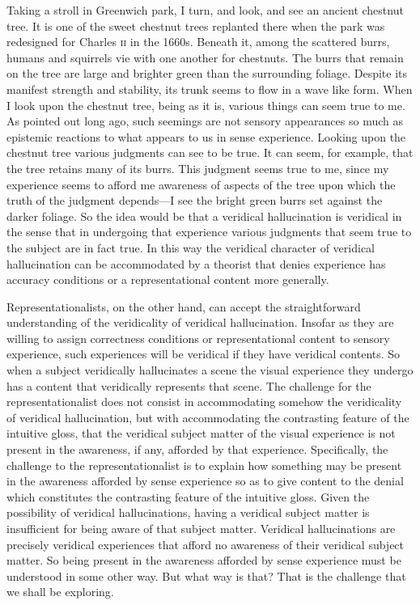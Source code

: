 \documentclass[12pt]{article}
\begin{document}
Taking a stroll in Greenwich park, I turn, and look, and see an ancient chestnut tree. It is one of the sweet chestnut trees replanted there when the park was redesigned for Charles \textsc{ii} in the 1660s. Beneath it, among the scattered burrs, humans and squirrels vie with one another for chestnuts. The burrs that remain on the tree are large and brighter green than the surrounding foliage. Despite its manifest strength and stability, its trunk seems to flow in a wave like form. When I look upon the chestnut tree, being as it is, various things can seem true to me. As \citet{Price:1952ix} pointed out long ago, such seemings are not sensory appearances so much as epistemic reactions to what appears to us in sense experience. Looking upon the chestnut tree various judgments can see to be true. It can seem, for example, that the tree retains many of its burrs. This judgment seems true to me, since my experience seems to afford me awareness of aspects of the tree upon which the truth of the judgment depends---I see the bright green burrs set against the darker foliage. So the idea would be that a veridical hallucination is veridical in the sense that in undergoing that experience various judgments that seem true to the subject are in fact true. In this way the veridical character of veridical hallucination can be accommodated by a theorist that denies experience has accuracy conditions or a representational content more generally.

Representationalists, on the other hand, can accept the straightforward understanding of the veridicality of veridical hallucination. Insofar as they are willing to assign correctness conditions or representational content to sensory experience, such experiences will be veridical if they have veridical contents. So when a subject veridically hallucinates a scene the visual experience they undergo has a content that veridically represents that scene. The challenge for the representationalist does not consist in accommodating somehow the veridicality of veridical hallucination, but with accommodating the contrasting feature of the intuitive gloss, that the veridical subject matter of the visual experience is not present in the awareness, if any, afforded by that experience. Specifically, the challenge to the representationalist is to explain how something may be present in the awareness afforded by sense experience so as to give content to the denial which constitutes the contrasting feature of the intuitive gloss. Given the possibility of veridical hallucinations, having a veridical subject matter is insufficient for being aware of that subject matter. Veridical hallucinations are precisely veridical experiences that afford no awareness of their veridical subject matter. So being present in the awareness afforded by sense experience must be understood in some other way. But what way is that? That is the challenge that we shall be exploring.
\end{document}
